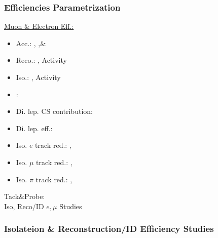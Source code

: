 \documentclass{beamer}
\begin{document}
\begin{frame}
 \frametitle{Efficiencies Parametrization}

 \underline{Muon \& Electron Eff.:}
 \begin{itemize}
  \item Acc.: \HT, \MHT ,\& \NJets
  \item Reco.: \pt, Activity
  \item Iso.: \pt, Activity
  \item \mt: \NJets
  \item Di. lep. CS contribution: \NJets
  \item Di. lep. eff.: \NJets
  \item Iso. $e$ track red.: \MHT, \NJets
  \item Iso. $\mu$ track red.: \MHT, \NJets
  \item Iso. $\pi$ track red.: \MHT, \NJets
 \end{itemize} 
\end{frame}


\begin{frame}
 \begin{block}{}
 \centering
 \Large Tack\&Probe:\\Iso, Reco/ID $e,\mu$ Studies
 \end{block}
\end{frame}

\begin{frame}
\frametitle{Isolateion \& Reconstruction/ID Efficiency Studies}
 \begin{center}
 \end{center}
\end{frame}
\end{document}

